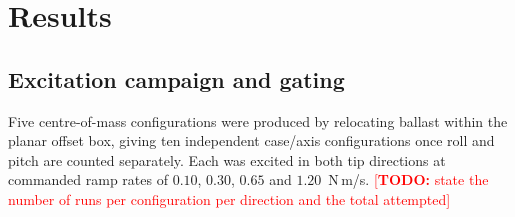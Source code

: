 %
%
%

\newcommand{\TODO}[1]{\textcolor{red}{[\textbf{TODO:} #1]}}

\section{Results}
\label{sec:results}

\subsection{Excitation campaign and gating}

Five centre-of-mass configurations were produced by relocating ballast
within the planar offset box, giving ten independent case/axis
configurations once roll and pitch are counted separately. Each was
excited in both tip directions at commanded ramp rates of $0.10$,
$0.30$, $0.65$ and $1.20$~N\,m/s. \TODO{state the number of runs per
configuration per direction and the total attempted}

